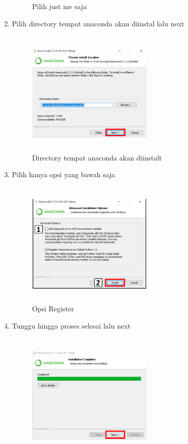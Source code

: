 \begin{enumerate}
\begin{figure}[H]
\caption{Pilih just me saja}
\label{akhir}
\end{figure}
\item Pilih directory tempat anaconda akan diinstal lalu next
\begin{figure}[H]
\centering
\includegraphics[width=6cm,height=6cm]{figures/4chan.png}
\caption{Directory tempat anaconda akan diinstalt}
\label{akhir}
\end{figure}
\item Pilih hanya opsi yang bawah saja
\begin{figure}[!htbp]
\centering
\includegraphics[width=6cm,height=6cm]{figures/5chan.png}
\caption{Opsi Register}
\label{akhir}
\end{figure}
\item Tunggu hingga proses selesai lalu next
\begin{figure}[H]
\centering
\includegraphics[width=6cm,height=6cm]{figures/6chan.png}

\end{figure}
\end{enumerate}
